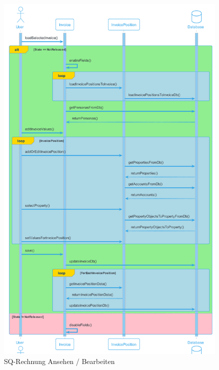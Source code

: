 \begin{figure}[H]
  \begin{center}
    \includegraphics[height=1\textheight]{content/diagrams/out/sequenzdiagram/rechnungAnsehenBearbeiten/RechnungAnsehenBearbeiten.png}
    \caption{SQ-Rechnung Ansehen / Bearbeiten}
  \end{center}
\end{figure}